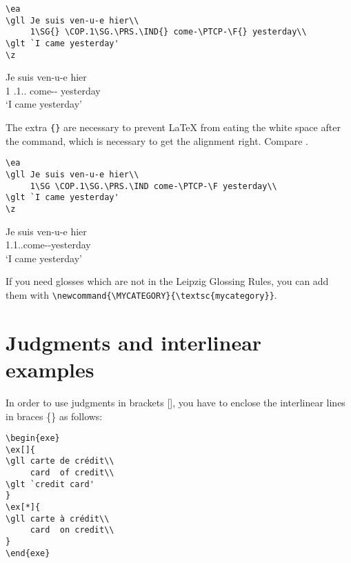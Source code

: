 \documentclass[output=guidelines]{langscibook}
\newcommand{\cmd}[1]{\texttt{\textbackslash#1}}
\begin{document}
\begin{lstlisting}
\ea
\gll Je suis ven-u-e hier\\
     1\SG{} \COP.1\SG.\PRS.\IND{} come-\PTCP-\F{} yesterday\\
\glt `I came yesterday'     
\z
 \end{lstlisting}
\ea
\gll Je suis ven-u-e hier\\
     1\SG{} \COP.1\SG.\PRS.\IND{} come-\PTCP-\F{} yesterday\\
\glt `I came yesterday'     
\z

The extra \texttt{\{\}} are necessary to prevent {\LaTeX} from eating the white space after the command, which is necessary to get the alignment right. Compare .

\begin{lstlisting}
\ea
\gll Je suis ven-u-e hier\\
     1\SG \COP.1\SG.\PRS.\IND come-\PTCP-\F yesterday\\
\glt `I came yesterday'     
\z
 \end{lstlisting}
\ea\label{ex:wrongalignment}
\gll Je suis ven-u-e hier\\
     1\SG \COP.1\SG.\PRS.\IND come-\PTCP-\F yesterday\\
\glt `I came yesterday'     
\z   

If you need glosses which are not in the Leipzig Glossing Rules, you can add them with \cmd{newcommand\{}\cmd{MYCATEGORY\}\{}\cmd{textsc\{mycategory\}\}}.


\section{Judgments and interlinear examples}
In order to use judgments in brackets [], you have to enclose the interlinear lines in braces \{\} as follows:

\begin{minipage}{.55\textwidth}
\begin{lstlisting}
\begin{exe}
\ex[]{
\gll carte de crédit\\ 
     card  of credit\\ 
\glt `credit card'     
}
\ex[*]{
\gll carte à crédit\\ 
     card  on credit\\  
}
\end{exe}
 \end{lstlisting}
\end{minipage}
\parbox{.45\textwidth}{ 
\begin{exe}
\end{exe}
}
\end{document}
